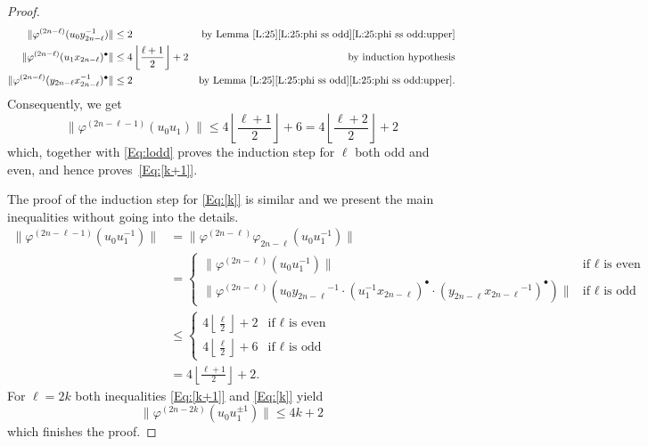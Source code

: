 \documentclass[12pt,reqno,a4paper]{article}
\newtheorem{corollary}[theorem]{Corollary}
\theoremstyle{definition}
\theoremstyle{remark}
\numberwithin{equation}{section}
\numberwithin{figure}{section}
\begin{document}
\begin{proof}
\begin{align*}
\|\varphi^{(2n-\ell)}(u_0y_{2n-\ell}^{-1})\| &\leq 2 
&\text{by Lemma \ref{L:25}\ref{L:25:phi ss odd}\ref{L:25:phi ss odd:upper}}\\
\|\varphi^{(2n-\ell)}(u_1x_{2n-\ell})^{\bullet}\| 
&\leq 4 \left\lfloor \frac{\ell+1}{2}\right\rfloor +2 &\text{by induction hypothesis}\\
\|\varphi^{(2n-\ell)}(y_{2n-\ell}x_{2n-\ell}^{-1})^{\bullet}\| 
&\leq 2 &\text{by Lemma \ref{L:25}\ref{L:25:phi ss odd}\ref{L:25:phi ss odd:upper}}.
\end{align*}
Consequently, we get
$$
\|\varphi^{(2n-\ell-1)}(u_0u_1)\| \leq 4 \left\lfloor \frac{\ell+1}{2}\right\rfloor +6
= 4 \left\lfloor \frac{\ell+2}{2}\right\rfloor + 2
$$
which, together with \eqref{Eq:lodd} 
proves the induction step for $\ell$ both odd and even, 
and hence proves~\eqref{Eq:[k+1]}.

The proof of the induction step for \eqref{Eq:[k]} is similar and we present
the main inequalities without going into the details.
\begin{align*}
\|\varphi^{(2n-\ell-1)}(u_0u_1^{-1})\|
&= \|\varphi^{(2n-\ell)}\varphi_{2n-\ell}(u_0u_1^{-1})\|\\
&=
\begin{cases}
\|\varphi^{(2n-\ell)}(u_0u_1^{-1}) \| &\text{if $\ell$ is even}\\
\|\varphi^{(2n-\ell)}(u_0y_{2n-\ell}{}^{-1}\cdot (u_1^{-1}x_{2n-\ell})^{\bullet}
\cdot (y_{2n-\ell}x_{2n-\ell}{}^{-1})^{\bullet}) \| 
&\text{if $\ell$ is odd}
\end{cases}
\\
& \leq 
\begin{cases}
4\left\lfloor\frac{\ell}{2}\right\rfloor +2  &\text{if $\ell$ is even}\\
4\left\lfloor \frac{\ell}{2}\right\rfloor + 6 
&\text{if $\ell$ is odd}
\end{cases}
\\
&= 4\left\lfloor \frac{\ell+1}{2}\right\rfloor + 2. 
\end{align*}
For $\ell = 2k$ both inequalities \eqref{Eq:[k+1]} and \eqref{Eq:[k]} 
yield
$$
\|\varphi^{(2n-2k)}(u_0u_1^{\pm 1})\|\leq 4k + 2
$$
which finishes the proof.
\end{proof}

\end{document}
